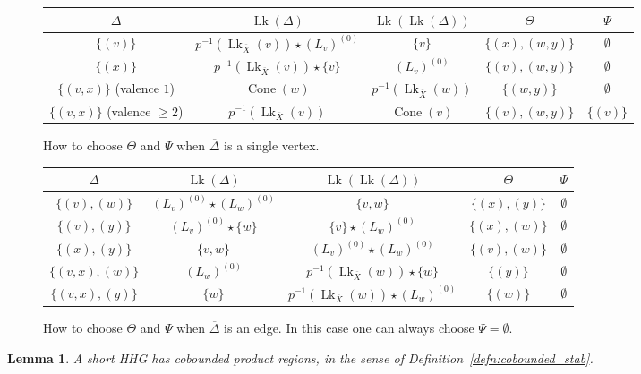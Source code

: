 \documentclass[svgnames]{amsart}
\theoremstyle{plain}
\newtheorem{lemma}[thm]{Lemma}
\theoremstyle{definition}
\newcommand{\ov}[1]{\overline{#1}}
\newcommand{\link}{\operatorname{Lk}}
\newcommand{\Squid}{\operatorname{Cone}}
\begin{document}
\begin{figure}[htp]
    \centering
    \begin{tabular}{c|c|c|c|c}
         $\Delta$& $\link(\Delta)$ & $\link(\link(\Delta))$ & $\Theta$ & $\Psi$ \\
         \hline
         $\{(v)\}$& $p^{-1}(\link_{\ov X}(v)) \star (L_v)^{(0)}$ & $\{v\}$ & $\{(x), (w, y)\}$& $\emptyset$\\
         $\{(x)\}$& $p^{-1}(\link_{\ov X}(v)) \star \{v\}$ & $(L_v)^{(0)}$ & $\{(v), (w, y)\}$& $\emptyset$\\
        $\{(v,x)\}$ (valence $1$)& $\Squid(w)$ & $p^{-1}(\link_{\ov X}(w))$ & $\{(w,y)\}$& $\emptyset$\\
        $\{(v,x)\}$ (valence $\ge 2$)& $p^{-1}(\link_{\ov X}(v))$ & $\Squid(v)$ & $\{(v), (w,y)\}$& $\{(v)\}$
    \end{tabular}
    \caption{How to choose $\Theta$ and $\Psi$ when $\ov\Delta$ is a single vertex. }
    \label{table:lklk1}
\end{figure}

\begin{figure}[htp]
    \centering
    \begin{tabular}{c|c|c|c|c}
         $\Delta$& $\link(\Delta)$ & $\link(\link(\Delta))$ & $\Theta$ & $\Psi$ \\
         \hline
         $\{(v),(w)\}$&  $(L_v)^{(0)}\star (L_w)^{(0)}$ & $\{v,w\}$ & $\{(x), (y)\}$& $\emptyset$\\
         $\{(v),(y)\}$&  $(L_v)^{(0)}\star \{w\}$ & $\{v\}\star (L_w)^{(0)}$ & $\{(x), (w)\}$& $\emptyset$\\
         $\{(x),(y)\}$&  $\{v,w\}$ & $(L_v)^{(0)}\star (L_w)^{(0)}$ & $\{(v), (w)\}$& $\emptyset$\\
        $\{(v,x),(w)\}$&  $(L_w)^{(0)}$ & $p^{-1}(\link_{\ov X}(w))\star \{w\}$ & $\{(y)\}$& $\emptyset$\\
        $\{(v,x),(y)\}$&  $\{w\}$ & $p^{-1}(\link_{\ov X}(w))\star (L_w)^{(0)}$ & $\{(w)\}$& $\emptyset$
    \end{tabular}
    \caption{How to choose $\Theta$ and $\Psi$ when $\ov\Delta$ is an edge. In this case one can always choose $\Psi=\emptyset$.}
    \label{table:lklk2}
\end{figure}

\begin{lemma}\label{lem:cobounded_stab_for_short}
    A short HHG has cobounded product regions, in the sense of Definition~\ref{defn:cobounded_stab}.
\end{lemma}
\end{document}
